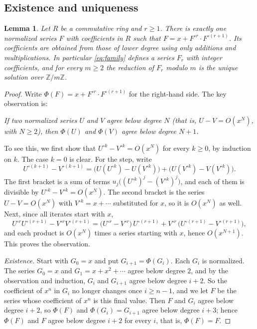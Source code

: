 \documentclass[11pt,a4paper]{article}
\newtheorem{lemma}[theorem]{Lemma}
\theoremstyle{definition}
\theoremstyle{remark}
\newcommand{\Z}{\mathbb{Z}}
\begin{document}
\subsection{Existence and uniqueness}

\begin{lemma}\label{lem:unique}
Let $R$ be a commutative ring and $r\ge1$. There is exactly one normalized series $F$ with coefficients in $R$ such
that $F=x+F^{\circ r}\cdot F^{\circ(r+1)}$. Its coefficients are obtained from those of lower degree using only
additions and multiplications. In particular \eqref{eq:family} defines a series $F_r$ with integer coefficients, and
for every $m\ge2$ the reduction of $F_r$ modulo $m$ is the unique solution over $\Z/m\Z$.
\end{lemma}

\begin{proof}
Write $\Phi(F)=x+F^{\circ r}\cdot F^{\circ(r+1)}$ for the right-hand side. The key observation is:

\emph{If two normalized series $U$ and $V$ agree below degree $N$ (that is, $U-V=O(x^N)$, with $N\ge2$), then $\Phi(U)$
and $\Phi(V)$ agree below degree $N+1$.}

To see this, we first show that $U^{\circ k}-V^{\circ k}=O(x^N)$ for every $k\ge0$, by induction on $k$. The case
$k=0$ is clear. For the step, write
\[
U^{\circ(k+1)}-V^{\circ(k+1)}=\bigl(U(U^{\circ k})-U(V^{\circ k})\bigr)+\bigl(U(V^{\circ k})-V(V^{\circ k})\bigr).
\]
The first bracket is a sum of terms $u_j\bigl((U^{\circ k})^j-(V^{\circ k})^j\bigr)$, and each of them is divisible by
$U^{\circ k}-V^{\circ k}=O(x^N)$. The second bracket is the series $U-V=O(x^N)$ with $V^{\circ k}=x+\cdots$ substituted
for $x$, so it is $O(x^N)$ as well. Next, since all iterates start with $x$,
\[
U^{\circ r}U^{\circ(r+1)}-V^{\circ r}V^{\circ(r+1)}
=\bigl(U^{\circ r}-V^{\circ r}\bigr)\,U^{\circ(r+1)}+V^{\circ r}\,\bigl(U^{\circ(r+1)}-V^{\circ(r+1)}\bigr),
\]
and each product is $O(x^N)$ times a series starting with $x$, hence $O(x^{N+1})$. This proves the observation.

\emph{Existence.} Start with $G_0=x$ and put $G_{i+1}=\Phi(G_i)$. Each $G_i$ is normalized. The series $G_0=x$ and
$G_1=x+x^2+\cdots$ agree below degree $2$, and by the observation and induction, $G_i$ and $G_{i+1}$ agree below degree
$i+2$. So the coefficient of $x^n$ in $G_i$ no longer changes once $i\ge n-1$, and we let $F$ be the series whose
coefficient of $x^n$ is this final value. Then $F$ and $G_i$ agree below degree $i+2$, so $\Phi(F)$ and
$\Phi(G_i)=G_{i+1}$ agree below degree $i+3$; hence $\Phi(F)$ and $F$ agree below degree $i+2$ for every $i$, that is,
$\Phi(F)=F$.


\end{proof}
\end{document}
